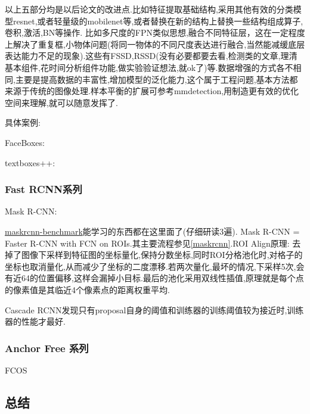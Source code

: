 \documentclass[UTF8]{ctexart}
\begin{document}
以上五部分均是以后论文的改进点.比如特征提取基础结构,采用其他有效的分类模型resnet,或者轻量级的mobilenet等,或者替换在新的结构上替换一些结构组成算子,卷积,激活,BN等操作. 比如多尺度的FPN类似思想,融合不同特征层，这在一定程度上解决了重复框,小物体问题(将同一物体的不同尺度表达进行融合,当然能减缓底层表达能力不足的现象).这些有FSSD,RSSD(没有必要都要去看,检测类的文章,理清基本组件,花时间分析组件功能,做实验验证想法,就ok了)等.数据增强的方式各不相同,主要是提高数据的丰富性,增加模型的泛化能力,这个属于工程问题,基本方法都来源于传统的图像处理.样本平衡的扩展可参考mmdetection,用制造更有效的优化空间来理解,就可以随意发挥了.

具体案例:

FaceBoxes:

textboxes++:


\subsubsection{Fast RCNN系列}
Mask R-CNN:

\href{https://github.com/facebookresearch/maskrcnn-benchmark}{maskrcnn-benchmark}能学习的东西都在这里面了(仔细研读3遍). 
Mask R-CNN = Faster R-CNN  with FCN on ROIs.其主要流程参见\ref{maskrcnn}.ROI Align原理:
去掉了图像下采样到特征图的坐标量化,保持分数坐标,同时ROI分格池化时,对格子的坐标也取消量化,从而减少了坐标的二度漂移.若两次量化,最坏的情况,下采样5次,会有近64的位置偏移,这样会漏掉小目标.最后的池化采用双线性插值,原理就是每个点的像素值是其临近4个像素点的距离权重平均.

Cascade RCNN发现只有proposal自身的阈值和训练器的训练阈值较为接近时,训练器的性能才最好.
\subsubsection{Anchor Free 系列}
FCOS

\subsection{总结}
\end{document}
